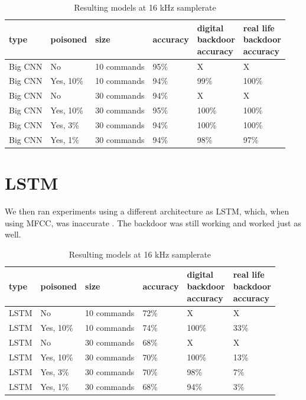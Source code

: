 \documentclass{report}
\theoremstyle{definition}
\theoremstyle{remark}
\begin{document}
\begin{table}[!hbt]
\centering
\begin{tabular}{|l|l|l|l|l|l|}
\hline
type & poisoned & size & accuracy &  \thead{digital \\ backdoor \\ accuracy} & \thead{real life \\ backdoor \\ accuracy} \\ \hline
Big CNN & No  &  10 commands  &  95\% & X & X\\ \hline
Big CNN & Yes, 10\%  &  10 commands  & 94\% & 99\%  & 100\% \\ \hline
Big CNN & No  &  30 commands  &   94\%  & X & X    \\ \hline
Big CNN & Yes, 10\%  &  30 commands  &  95\% & 100\% &  100\%     \\ \hline
Big CNN & Yes, 3\%  &  30 commands  &  94\%  & 100\% &  100\%  \\ \hline
Big CNN & Yes, 1\%  &  30 commands  &  94\%  & 98\%  &  97\% \\ \hline
\end{tabular}
\caption{Resulting models at 16 kHz samplerate}
\end{table}

\section{LSTM}
We then ran experiments using a different architecture as LSTM, which, when using MFCC, was inaccurate . The backdoor was still working and worked just as well.

\begin{table}[!hbt]
\centering
\begin{tabular}{|l|l|l|l|l|l|}
\hline
type & poisoned & size & accuracy &  \thead{digital \\ backdoor \\ accuracy} & \thead{real life \\ backdoor \\ accuracy} \\ \hline
LSTM & No  &  10 commands  &  72\% & X & X \\ \hline
LSTM & Yes, 10\%  &  10 commands  & 74\% & 100\% &  33\% \\ \hline
LSTM & No  &  30 commands  &   68\%  & X  & X   \\ \hline
LSTM & Yes, 10\%  &  30 commands  &  70\% & 100\% &  13\%     \\ \hline
LSTM & Yes, 3\%  &  30 commands  &  70\%  & 98\%  &  7\% \\ \hline
LSTM & Yes, 1\%  &  30 commands  &  68\%  & 94\%  &  3\% \\ \hline
\end{tabular}
\caption{Resulting models at 16 kHz samplerate}
\end{table}
\end{document}

